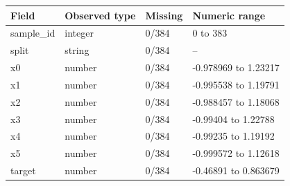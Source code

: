 \begin{tabular}{llll}
\toprule
Field & Observed type & Missing & Numeric range \\
\midrule
sample\_id & integer & 0/384 & 0 to 383 \\
split & string & 0/384 & -- \\
x0 & number & 0/384 & -0.978969 to 1.23217 \\
x1 & number & 0/384 & -0.995538 to 1.19791 \\
x2 & number & 0/384 & -0.988457 to 1.18068 \\
x3 & number & 0/384 & -0.99404 to 1.22788 \\
x4 & number & 0/384 & -0.99235 to 1.19192 \\
x5 & number & 0/384 & -0.999572 to 1.12618 \\
target & number & 0/384 & -0.46891 to 0.863679 \\
\bottomrule
\end{tabular}

